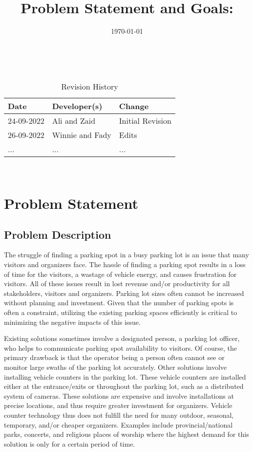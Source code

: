 \documentclass{article}
\title{Problem Statement and Goals: \progname}
\author{\authname}
\date{\today}
\begin{document}
\maketitle

~\newpage


\begin{table}[hp]
\caption{Revision History} \label{TblRevisionHistory}
\begin{tabularx}{\textwidth}{llX}
\toprule
\textbf{Date} & \textbf{Developer(s)} & \textbf{Change}\\
\midrule
24-09-2022 & Ali and Zaid & Initial Revision\\
26-09-2022 & Winnie and Fady & Edits \\
... & ... & ...\\
\bottomrule
\end{tabularx}
\end{table}

~\newpage

\section{Problem Statement}
\subsection{Problem Description}

\indent The struggle of finding a parking spot in a busy parking lot is an issue that many visitors and organizers face. The hassle of finding a parking spot results in a loss of time for the visitors, a wastage of vehicle energy, and causes frustration for visitors. All of these issues result in lost revenue and/or productivity for all stakeholders, visitors and organizers. Parking lot sizes often cannot be increased without planning and investment. Given that the number of parking spots is often a constraint, utilizing the existing parking spaces efficiently is critical to minimizing the negative impacts of this issue.


\indent Existing solutions sometimes involve a designated person, a parking lot officer, who helps to communicate parking spot availability to visitors. Of course, the primary drawback is that the operator being a person often cannot see or monitor large swaths of the parking lot accurately. Other solutions involve installing vehicle counters in the parking lot. These vehicle counters are installed either at the entrance/exits or throughout the parking lot, such as a distributed system of cameras.  These solutions are expensive and involve installations at precise locations, and thus require greater investment for organizers. Vehicle counter technology thus does not fulfill the need for many outdoor, seasonal, temporary, and/or cheaper organizers.  Examples include provincial/national parks, concerts, and religious places of worship where the highest demand for this solution is only for a certain period of time. 
\end{document}
